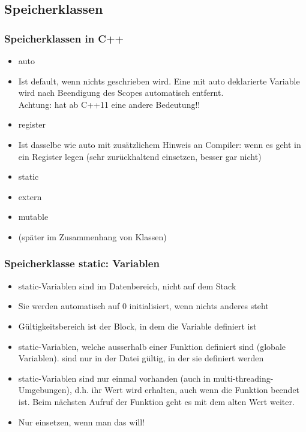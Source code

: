 
\subsection{Speicherklassen\hfill}
\label{sec:unterabschnitt}

\subsubsection{Speicherklassen in C++\hfill}
\label{sec:unterunterabschnitt}
\begin{itemize}
	\item auto
	\item[\-] Ist default, wenn nichts geschrieben wird. Eine mit auto deklarierte Variable wird nach Beendigung des Scopes automatisch entfernt.\\
	Achtung: hat ab C++11 eine andere Bedeutung!!
	\item register
	\item[\-] Ist dasselbe wie auto mit zusätzlichem Hinweis an Compiler: wenn es geht in ein Register legen (sehr zurückhaltend einsetzen, besser gar nicht)
	\item static
	\item extern
	\item mutable
	\item[\-] (später im Zusammenhang von Klassen)
\end{itemize}

\subsubsection{Speicherklasse static: Variablen\hfill}
\label{sec:unterunterabschnitt}
\begin{itemize}
	\item static-Variablen sind im Datenbereich, nicht auf dem Stack
	\item Sie werden automatisch auf 0 initialisiert, wenn nichts anderes steht
	\item Gültigkeitsbereich ist der Block, in dem die Variable definiert ist
	\item static-Variablen, welche ausserhalb einer Funktion definiert sind (globale Variablen). sind nur in der Datei gültig, in der sie definiert werden
	\item static-Variablen sind nur einmal vorhanden (auch in multi-threading-Umgebungen), d.h. ihr Wert wird erhalten, auch wenn die Funktion beendet ist. Beim nächsten Aufruf der Funktion geht es mit dem alten Wert weiter.\color{\ownRed}
	\item Nur einsetzen, wenn man das will!\color{black}
\end{itemize}

